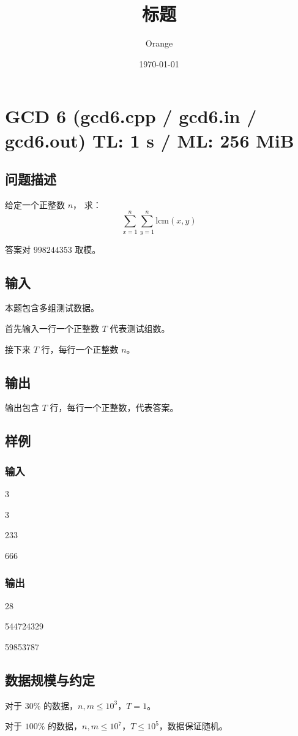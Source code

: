 \documentclass[UTF8]{article}
\title{标题}
\author{Orange}
\date{\today}
\begin{document}
	\heiti

	\section{GCD 6 \small(gcd6.cpp / gcd6.in / gcd6.out) TL: 1 s / ML: 256 MiB}
	\subsection{问题描述}
	给定一个正整数 $n$，
	求：
	$$
	\sum_{x = 1}^{n} \sum_{y = 1}^{n} \mathrm{lcm}(x, y)
	$$

	答案对 $998244353$ 取模。

	\subsection{输入}
	本题包含多组测试数据。

	首先输入一行一个正整数 $T$ 代表测试组数。

	接下来 $T$ 行，每行一个正整数 $n$。

	\subsection{输出}
	输出包含 $T$ 行，每行一个正整数，代表答案。

	\subsection{样例}
	\subsubsection{输入}
	3

	3

	233

	666

	\subsubsection{输出}
	28

	544724329

	59853787

	\subsection{数据规模与约定}
	对于 $30\%$ 的数据，$n, m \le 10^3$，$T = 1$。

	对于 $100\%$ 的数据，$n, m \le 10^7$，$T \le 10^5$，数据保证随机。
\end{document}

